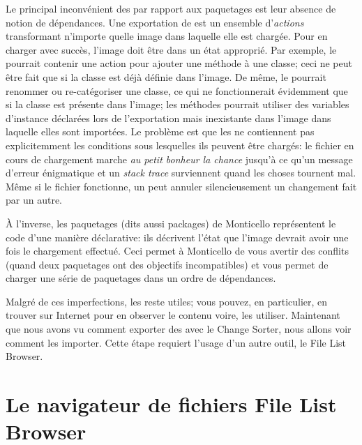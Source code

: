 \documentclass[a4paper,10pt,twoside]{book}
\begin{document}
Le principal inconv\'enient des \changesets par rapport aux paquetages 
est leur absence de notion de d\'ependances.
Une exportation de \changeset est un ensemble d'\emph{actions} transformant n'importe quelle
image dans laquelle elle est charg\'ee. Pour en charger avec succ\`es, l'image doit \^etre
dans un \'etat appropri\'e.
Par exemple, le \changeset pourrait contenir une action pour ajouter une m\'ethode \`a une
classe; ceci ne peut \^etre fait que si la classe est d\'ej\`a d\'efinie dans l'image.
De m\^eme, le \changeset pourrait renommer ou re-cat\'egoriser une classe, ce qui ne 
fonctionnerait \'evidemment que si la classe est pr\'esente dans l'image; les m\'ethodes
pourrait utiliser des variables d'instance d\'eclar\'ees lors de l'exportation mais
inexistante dans l'image dans laquelle elles sont import\'ees.
Le probl\`eme est que les \changesets ne contiennent pas explicitemment les conditions 
sous lesquelles ils peuvent \^etre charg\'es:
le fichier en cours de chargement marche \emph{au petit bonheur la chance} jusqu'\`a
ce qu'un message d'erreur \'enigmatique et un \emph{stack trace} surviennent
quand les choses tournent mal.
M\^eme si le fichier fonctionne, un \changeset peut annuler silencieusement 
un changement fait par un autre.

\`A l'inverse, les paquetages (dits aussi packages) de Monticello repr\'esentent le code d'une mani\`ere 
d\'eclarative: ils d\'ecrivent l'\'etat que l'image devrait avoir une fois le chargement
effectu\'e.
Ceci permet \`a Monticello de vous avertir des conflits (quand deux paquetages ont des
objectifs incompatibles)
et vous permet de charger une s\'erie de paquetages dans un ordre de d\'ependances.

Malgr\'e de ces imperfections, les \changesets reste utiles; vous pouvez, en particulier, en trouver sur Internet pour en observer le contenu voire, les utiliser.
Maintenant que nous avons vu comment exporter des \changesets avec le Change Sorter,
nous allons voir comment les importer.
Cette \'etape requiert l'usage d'un autre outil, le File List Browser.

\section{Le navigateur de fichiers File List Browser}
\end{document}
